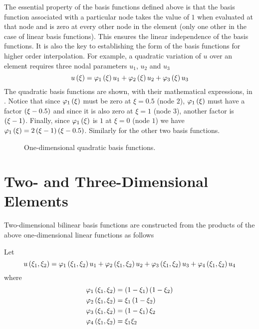 The essential property of the 
basis functions defined above is that the basis function associated with a 
particular node takes the value of $1$ when evaluated at that node and is zero at
every other node in the element (only one other in the case of linear basis 
functions). This ensures the linear independence of the basis functions. 
It is also the key to establishing the form of the basis functions for higher order
interpolation.  For example, a quadratic variation of $u$ over an element
requires three nodal parameters $u_{1}$, $u_{2}$ and $u_{3}$
\begin{equation}
   u\left( \xi \right)  =    \varphi_{1} \left( \xi \right)  u_{1} +    \varphi_{2} \left( \xi \right)  u_{2} +    \varphi_{3} \left( \xi \right)  u_{3}  
  \label{eqn:Qbf}
\end{equation}
The quadratic basis functions are shown, with their mathematical expressions,
in . Notice that since $   \varphi_{1} \left( \xi \right)  $ must be zero at
$\xi=0.5$ (node $2$), $   \varphi_{1} \left( \xi \right)  $ must have a factor $\left( \xi-0.5 \right)$
and since it is also zero at $\xi=1$ (node $3$), another factor is
$\left( \xi-1 \right)$.  Finally, since $   \varphi_{1} \left( \xi \right)  $ is $1$ at $\xi=0$ (node $1$)
we have $   \varphi_{1} \left( \xi \right)   = 2\left( \xi-1 \right)\left( \xi-0.5 \right)$.  Similarly for the
other two basis functions.

\begin{figure}[htbp] \centering
  
  \caption{One-dimensional quadratic basis functions.}
  \label{fig:1DQbf}
\end{figure}

\section{Two- and Three-Dimensional Elements}

Two-dimensional bilinear 
basis functions are constructed from the products of the above 
one-dimensional linear functions as follows

Let   
\begin{equation*}
   u\left( \xi_{1},\xi_{2} \right)  =    \varphi_{1} \left( \xi_{1},\xi_{2} \right)  u_{1} +
     \varphi_{2} \left( \xi_{1},\xi_{2} \right)  u_{2} +
     \varphi_{3} \left( \xi_{1},\xi_{2} \right)  u_{3} +    \varphi_{4} \left( \xi_{1},\xi_{2} \right)  u_{4}
\end{equation*}
where  
\begin{equation}
\begin{split}
       \varphi_{1} \left( \xi_{1},\xi_{2} \right)   &= \left( 1- \xi_{1} \right)\left( 1- \xi_{2} \right) \\
       \varphi_{2} \left( \xi_{1},\xi_{2} \right)   &= \xi_{1}\left( 1- \xi_{2} \right) \\ 
       \varphi_{3} \left( \xi_{1},\xi_{2} \right)   &= \left( 1- \xi_{1} \right)\xi_{2} \\
       \varphi_{4} \left( \xi_{1},\xi_{2} \right)   &= \xi_{1}\xi_{2}
  \end{split}
  \label{eqn:2,3DE}
\end{equation}

